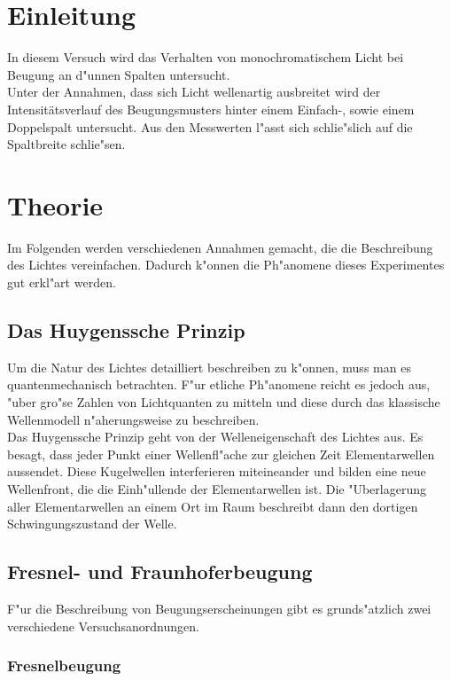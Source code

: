 \section{Einleitung}
	\label{sec:einleitung}
	In diesem Versuch wird das Verhalten von monochromatischem Licht bei Beugung an d"unnen Spalten untersucht.\\
	Unter der Annahmen, dass sich Licht wellenartig ausbreitet wird der Intensitätsverlauf des Beugungsmusters hinter einem Einfach-, sowie einem Doppelspalt untersucht.
	Aus den Messwerten l"asst sich schlie"slich auf die Spaltbreite schlie"sen.

\section{Theorie}
	\label{sec:theorie}

	Im Folgenden werden verschiedenen Annahmen gemacht, die die Beschreibung des Lichtes vereinfachen.
	Dadurch k"onnen die Ph"anomene dieses Experimentes gut erkl"art werden.

	\subsection{Das Huygenssche Prinzip}

		Um die Natur des Lichtes detailliert beschreiben zu k"onnen, muss man es quan\-ten\-me\-cha\-nisch betrachten.
		F"ur etliche Ph"anomene reicht es jedoch aus, "uber gro"se Zahlen von Lichtquanten zu mitteln und diese durch das klassische Wellenmodell n"aherungsweise zu beschreiben.\\

		Das Huygenssche Prinzip geht von der Welleneigenschaft des Lichtes aus.
		Es besagt, dass jeder Punkt einer Wellenfl"ache zur gleichen Zeit Elementarwellen aussendet.
		Diese Kugelwellen interferieren miteineander und bilden eine neue Wellenfront,
		die die Ein\-h"ul\-len\-de der Elementarwellen ist.
		Die "Uberlagerung aller Elementarwellen an einem Ort im Raum beschreibt dann den dortigen Schwingungszustand der Welle.

	\subsection{Fresnel- und Fraunhoferbeugung}
		\label{subsec:beugung}

		F"ur die Beschreibung von Beugungserscheinungen gibt es grunds"atzlich zwei verschiedene Versuchsanordnungen.

		\subsubsection{Fresnelbeugung}
			\label{subsubsec:fresnel}

